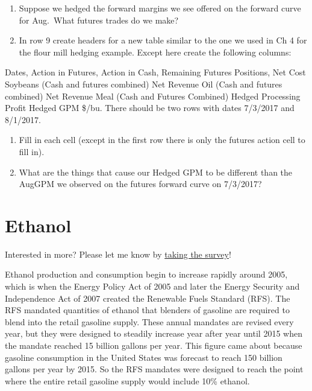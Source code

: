 \documentclass[
  letterpaper,
  DIV=11,
  numbers=noendperiod]{scrreprt}
\begin{document}
\begin{enumerate}
\def\labelenumi{\arabic{enumi}.}
\setcounter{enumi}{1}
\item
  Suppose we hedged the forward margins we see offered on the forward
  curve for Aug.~What futures trades do we make?
\item
  In row 9 create headers for a new table similar to the one we used in
  Ch 4 for the flour mill hedging example. Except here create the
  following columns:
\end{enumerate}

Dates, Action in Futures, Action in Cash, Remaining Futures Positions,
Net Cost Soybeans (Cash and futures combined) Net Revenue Oil (Cash and
futures combined) Net Revenue Meal (Cash and Futures Combined) Hedged
Processing Profit Hedged GPM \$/bu. There should be two rows with dates
7/3/2017 and 8/1/2017.

\begin{enumerate}
\def\labelenumi{\arabic{enumi}.}
\setcounter{enumi}{3}
\item
  Fill in each cell (except in the first row there is only the futures
  action cell to fill in).
\item
  What are the things that cause our Hedged GPM to be different than the
  AugGPM we observed on the futures forward curve on 7/3/2017?
\end{enumerate}


\hypertarget{ethanol}{%
\chapter{Ethanol}\label{ethanol}}

{Interested in more? Please let me know by}
\href{https://forms.gle/Q3VByCQZHjfQSy9D7}{taking the survey}!

Ethanol production and consumption begin to increase rapidly around
2005, which is when the Energy Policy Act of 2005 and later the Energy
Security and Independence Act of 2007 created the Renewable Fuels
Standard (RFS). The RFS mandated quantities of ethanol that blenders of
gasoline are required to blend into the retail gasoline supply. These
annual mandates are revised every year, but they were designed to
steadily increase year after year until 2015 when the mandate reached 15
billion gallons per year. This figure came about because gasoline
consumption in the United States was forecast to reach 150 billion
gallons per year by 2015. So the RFS mandates were designed to reach the
point where the entire retail gasoline supply would include 10\%
ethanol.
\end{document}
